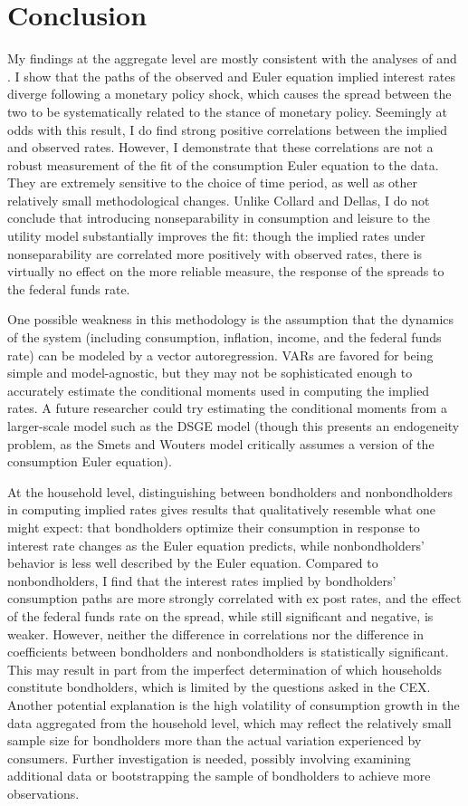 \section{Conclusion}
My findings at the aggregate level are mostly consistent with the analyses of \cite{canzoneri07} and \cite{collard11}. I show that the paths of the observed and Euler equation implied interest rates diverge following a monetary policy shock, which causes the spread between the two to be systematically related to the stance of monetary policy. Seemingly at odds with this result, I do find strong positive correlations between the implied and observed rates. However, I demonstrate that these correlations are not a robust measurement of the fit of the consumption Euler equation to the data. They are extremely sensitive to the choice of time period, as well as other relatively small methodological changes. Unlike Collard and Dellas, I do not conclude that introducing nonseparability in consumption and leisure to the utility model substantially improves the fit: though the implied rates under nonseparability are correlated more positively with observed rates, there is virtually no effect on the more reliable measure, the response of the spreads to the federal funds rate.

One possible weakness in this methodology is the assumption that the dynamics of the system (including consumption, inflation, income, and the federal funds rate) can be modeled by a vector autoregression. VARs are favored for being simple and model-agnostic, but they may not be sophisticated enough to accurately estimate the conditional moments used in computing the implied rates. A future researcher could try estimating the conditional moments from a larger-scale model such as the \cite{smets07} DSGE model (though this presents an endogeneity problem, as the Smets and Wouters model critically assumes a version of the consumption Euler equation).

At the household level, distinguishing between bondholders and nonbondholders in computing implied rates gives results that qualitatively resemble what one might expect: that bondholders optimize their consumption in response to interest rate changes as the Euler equation predicts, while nonbondholders' behavior is less well described by the Euler equation. Compared to nonbondholders, I find that the interest rates implied by bondholders' consumption paths are more strongly correlated with ex post rates, and the effect of the federal funds rate on the spread, while still significant and negative, is weaker. However, neither the difference in correlations nor the difference in coefficients between bondholders and nonbondholders is statistically significant. This may result in part from the imperfect determination of which households constitute bondholders, which is limited by the questions asked in the CEX. Another potential explanation is the high volatility of consumption growth in the data aggregated from the household level, which may reflect the relatively small sample size for bondholders more than the actual variation experienced by consumers. Further investigation is needed, possibly involving examining additional data or bootstrapping the sample of bondholders to achieve more observations.


